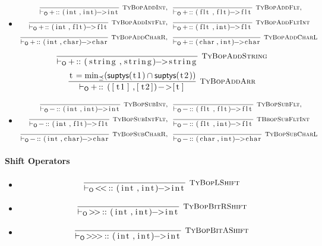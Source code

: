 \documentclass{article}
\newcommand{\code}[1]{\lstinline[columns=fixed]{#1}}
\newcommand{\drmrule}[5]{\frac{#1}{#2\vdash_{\mathsf{#3}}#4}\textsc{\ \small{#5}}}
\newcommand{\mc}[1]{\textnormal{\code{#1}}}
\newcommand{\subsubsubsection}{\paragraph}
\begin{document}
					\begin{itemize}
						\item
							\begin{align*}
								\drmrule{}{}{O}{\mc{+} :: \mc{(int,int)->int}}{TyBopAddInt},\ \ &
								\drmrule{}{}{O}{\mc{+} :: \mc{(flt,flt)->flt}}{TyBopAddFlt},\\
								\drmrule{}{}{O}{\mc{+} :: \mc{(int,flt)->flt}}{TyBopAddIntFlt},\ \ & 
								\drmrule{}{}{O}{\mc{+} :: \mc{(flt,int)->flt}}{TyBopAddFltInt}\\
								\drmrule{}{}{O}{\mc{+} :: \mc{(int,char)->char}}{TyBopAddCharR},\ \ &
								\drmrule{}{}{O}{\mc{+} :: \mc{(char,int)->char}}{TyBopAddCharL}
							\end{align*}\begin{align*}
								\drmrule{}{}{O}{\mc{+} :: \mc{(string,string)->string}}{TyBopAddString}
							\end{align*}\begin{align*}
								\drmrule{\mc{t}=\min_\preceq(\mathsf{suptys}(\mc{t1})\cap\mathsf{suptys}(\mc{t2}))}{}{O}{\mc{+} :: \mc{([t1],[t2])->[t]}}{TyBopAddArr}
							\end{align*}
						\item
							\begin{align*}
								\drmrule{}{}{O}{\mc{-} :: \mc{(int,int)->int}}{TyBopSubInt},\ \ &
								\drmrule{}{}{O}{\mc{-} :: \mc{(flt,flt)->flt}}{TyBopSubFlt},\\
								\drmrule{}{}{O}{\mc{-} :: \mc{(int,flt)->flt}}{TyBopSubIntFlt},\ \ & 
								\drmrule{}{}{O}{\mc{-} :: \mc{(flt,int)->flt}}{TBbopSubFltInt}\\
								\drmrule{}{}{O}{\mc{-} :: \mc{(int,char)->char}}{TyBopSubCharR},\ \ &
								\drmrule{}{}{O}{\mc{-} :: \mc{(char,int)->char}}{TyBopSubCharL}
							\end{align*}
					\end{itemize}
				
				\subsubsubsection{Shift Operators}
				
					\begin{itemize}
						\item
							\begin{align*}
								\drmrule{}{}{O}{\mc{<<} :: \mc{(int,int)->int}}{TyBopLShift}
							\end{align*}
						\item
							\begin{align*}
								\drmrule{}{}{O}{\mc{>>} :: \mc{(int,int)->int}}{TyBopBitRShift}
							\end{align*}
						\item
							\begin{align*}
								\drmrule{}{}{O}{\mc{>>>} :: \mc{(int,int)->int}}{TyBopBitAShift}
							\end{align*}
					\end{itemize}
				
\end{document}
